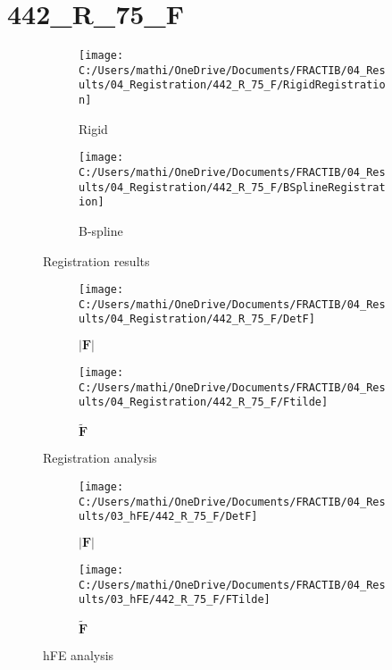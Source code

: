 \documentclass{article}%
\begin{document}
%
\newpage%
\section*{442\_R\_75\_F}%
\label{sec:442R75F}%


\begin{figure}[h!]%
\begin{subfigure}[b]{0.5\linewidth}%
\texttt{[image: C:/Users/mathi/OneDrive/Documents/FRACTIB/04\_Results/04\_Registration/442\_R\_75\_F/RigidRegistration]}%
\caption{Rigid}%
\end{subfigure}%
\begin{subfigure}[b]{0.5\linewidth}%
\texttt{[image: C:/Users/mathi/OneDrive/Documents/FRACTIB/04\_Results/04\_Registration/442\_R\_75\_F/BSplineRegistration]}%
\caption{B{-}spline}%
\end{subfigure}%
\caption{Registration results}%
\end{figure}

%


\begin{figure}[h!]%
\begin{subfigure}[b]{0.5\linewidth}%
\texttt{[image: C:/Users/mathi/OneDrive/Documents/FRACTIB/04\_Results/04\_Registration/442\_R\_75\_F/DetF]}%
\caption{$|\mathbf{F}|$}%
\end{subfigure}%
\begin{subfigure}[b]{0.5\linewidth}%
\texttt{[image: C:/Users/mathi/OneDrive/Documents/FRACTIB/04\_Results/04\_Registration/442\_R\_75\_F/Ftilde]}%
\caption{$\tilde{\mathbf{F}}$}%
\end{subfigure}%
\caption{Registration analysis}%
\end{figure}

%


\begin{figure}[h!]%
\begin{subfigure}[b]{0.5\linewidth}%
\texttt{[image: C:/Users/mathi/OneDrive/Documents/FRACTIB/04\_Results/03\_hFE/442\_R\_75\_F/DetF]}%
\caption{$|\mathbf{F}|$}%
\end{subfigure}%
\begin{subfigure}[b]{0.5\linewidth}%
\texttt{[image: C:/Users/mathi/OneDrive/Documents/FRACTIB/04\_Results/03\_hFE/442\_R\_75\_F/FTilde]}%
\caption{$\tilde{\mathbf{F}}$}%
\end{subfigure}%
\caption{hFE analysis}%
\end{figure}
\end{document}
